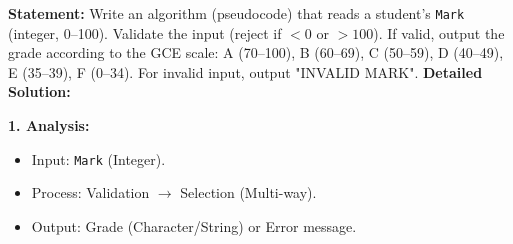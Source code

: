 \documentclass[11pt]{article}
\begin{document}
\begin{exoresolu}
\textbf{Statement:} Write an algorithm (pseudocode) that reads a student's \texttt{Mark} (integer, 0--100). Validate the input (reject if $<0$ or $>100$). If valid, output the grade according to the GCE scale: A (70--100), B (60--69), C (50--59), D (40--49), E (35--39), F (0--34). For invalid input, output "INVALID MARK".
\tcblower
\textbf{Detailed Solution:}

\noindent\textbf{1. Analysis:}
\begin{itemize}
    \item Input: \texttt{Mark} (Integer).
    \item Process: Validation $\rightarrow$ Selection (Multi-way).
    \item Output: Grade (Character/String) or Error message.
\end{itemize}


\end{exoresolu}
\end{document}
